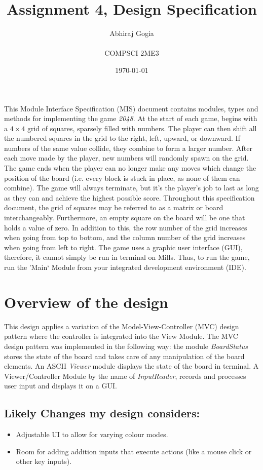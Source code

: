 \documentclass{article}
\title{Assignment 4, Design Specification}
\author{Abhiraj Gogia \\\\ COMPSCI 2ME3 }
\date{\today}
\begin{document}
\doublespacing

\maketitle

This Module Interface Specification (MIS) document contains modules, types and methods for implementing the game \textit{2048}. At the start of each game, begins with a $4 \times 4$ grid of squares, sparsely filled with numbers. The player can then shift all the numbered squares in the grid to the right, left, upward, or downward. If numbers of the same value collide, they combine to form a larger number. After each move made by the player, new numbers will randomly spawn on the grid. The game ends when the player can no longer make any moves which change the position of the board (i.e. every block is stuck in place, as none of them can combine). The game will always terminate, but it's the player's job to last as long as they can and achieve the highest possible score. Throughout this specification document, the grid of squares may be referred to as a matrix or board interchangeably. Furthermore, an empty square on the board will be one that holds a value of zero. In addition to this, the row number of the grid increases when going from top to bottom, and the column number of the grid increases when going from left to right. The game uses a graphic user interface (GUI), therefore, it cannot simply be run in terminal on Mills. Thus, to run the game, run the 'Main` Module from your integrated development environment (IDE).

\section*{Overview of the design}
This design applies a variation of the Model-View-Controller (MVC) design pattern where the controller is integrated into the View Module. The MVC design pattern was implemented in the following way:  the module \textit{BoardStatus} stores the state of the board and takes care of any manipulation of the board elements. An ASCII \textit{Viewer} module displays the state of the board in terminal. A Viewer/Controller Module by the name of \textit{InputReader}, records and processes user input and displays it on a GUI.

\subsection*{Likely Changes my design considers:}
\begin{itemize}
    \item Adjustable UI to allow for varying colour modes.
    \item Room for adding addition inputs that execute actions (like a mouse click or other key inputs).
\end{itemize}
\newpage
\end{document}
